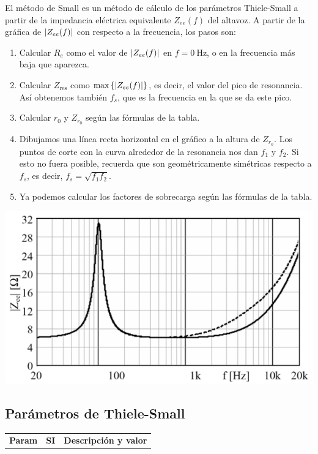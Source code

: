 \documentclass[a4paper, 8pt]{extarticle}
\begin{document}
\begin{multicols}{3}
    El método de Small es un método de cálculo de los parámetros Thiele-Small a partir de la impedancia eléctrica equivalente $Z_{ee}(f)$ del altavoz. A partir de la gráfica de $\abs{Z_{ee}(f)}$ con respecto a la frecuencia, los pasos son:
    \begin{enumerate}
        \item Calcular $R_e$ como el valor de $\abs{Z_{ee}(f)}$ en $f=\qty{0}{\Hz}$, o en la frecuencia más baja que aparezca.
        \item Calcular $Z _{\text{res}}$ como $\max \left\lbrace \abs{Z_{ee}(f)} \right\rbrace $, es decir, el valor del pico de resonancia. Así obtenemos también $f _s$, que es la frecuencia en la que se da este pico.
        \item Calcular $r_0$ y $Z_{r_0}$ según las fórmulas de la tabla.
        \item Dibujamos una línea recta horizontal en el gráfico a la altura de $Z_{r_0}$. Los puntos de corte con la curva alrededor de la resonancia nos dan $f_1$ y $f_2$. \color{gray} Si esto no fuera posible, recuerda que son geométricamente simétricas respecto a $f_s$, es decir, $f_s = \sqrt{f_1 f_2}$. \color{black}
        \item Ya podemos calcular los factores de sobrecarga según las fórmulas de la tabla.
    \end{enumerate}
    \begin{center}
        \includegraphics[width=\linewidth]{images/Zeq.png}
    \end{center}

    \subsection{Parámetros de Thiele-Small}
    \begin{center}
        \begin{tabular}{|c|c|l|}
            \hline
            \textbf{Param}     & \textbf{SI}             & \textbf{Descripción y valor}                                                                                                                                  \\


\end{tabular}
\end{center}
\end{multicols}
\end{document}
